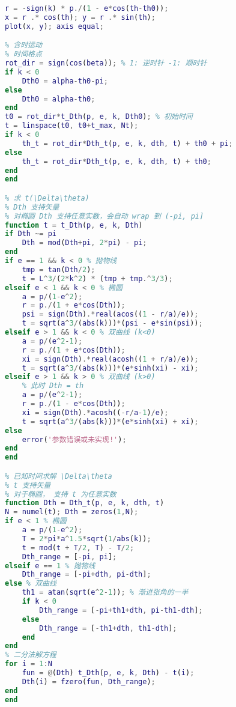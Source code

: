 \begin{lstlisting}[language=matlab,caption=kepler.m]
% 画出轨道
r = -sign(k) * p./(1 - e*cos(th-th0));
x = r .* cos(th); y = r .* sin(th);
plot(x, y); axis equal;

% 含时运动
% 时间格点
rot_dir = sign(cos(beta)); % 1: 逆时针 -1: 顺时针
if k < 0
    Dth0 = alpha-th0-pi;
else
    Dth0 = alpha-th0;
end
t0 = rot_dir*t_Dth(p, e, k, Dth0); % 初始时间
t = linspace(t0, t0+t_max, Nt);
if k < 0
    th_t = rot_dir*Dth_t(p, e, k, dth, t) + th0 + pi;
else
    th_t = rot_dir*Dth_t(p, e, k, dth, t) + th0;
end
end

% 求 t(\Delta\theta)
% Dth 支持矢量
% 对椭圆 Dth 支持任意实数，会自动 wrap 到 (-pi, pi]
function t = t_Dth(p, e, k, Dth)
if Dth ~= pi
    Dth = mod(Dth+pi, 2*pi) - pi;
end
if e == 1 && k < 0 % 抛物线
    tmp = tan(Dth/2);
    t = L^3/(2*k^2) * (tmp + tmp.^3/3);
elseif e < 1 && k < 0 % 椭圆
    a = p/(1-e^2);
    r = p./(1 + e*cos(Dth));
    psi = sign(Dth).*real(acos((1 - r/a)/e));
    t = sqrt(a^3/(abs(k)))*(psi - e*sin(psi));
elseif e > 1 && k < 0 % 双曲线 (k<0)
    a = p/(e^2-1);
    r = p./(1 + e*cos(Dth));
    xi = sign(Dth).*real(acosh((1 + r/a)/e));
    t = sqrt(a^3/(abs(k)))*(e*sinh(xi) - xi);
elseif e > 1 && k > 0 % 双曲线 (k>0)
    % 此时 Dth = th
    a = p/(e^2-1);
    r = p./(1 - e*cos(Dth));
    xi = sign(Dth).*acosh((-r/a-1)/e);
    t = sqrt(a^3/(abs(k)))*(e*sinh(xi) + xi);
else
    error('参数错误或未实现!');
end
end

% 已知时间求解 \Delta\theta
% t 支持矢量
% 对于椭圆， 支持 t 为任意实数
function Dth = Dth_t(p, e, k, dth, t)
N = numel(t); Dth = zeros(1,N);
if e < 1 % 椭圆
    a = p/(1-e^2);
    T = 2*pi*a^1.5*sqrt(1/abs(k));
    t = mod(t + T/2, T) - T/2;
    Dth_range = [-pi, pi];
elseif e == 1 % 抛物线
    Dth_range = [-pi+dth, pi-dth];
else % 双曲线
    th1 = atan(sqrt(e^2-1)); % 渐进张角的一半
    if k < 0
        Dth_range = [-pi+th1+dth, pi-th1-dth];
    else
        Dth_range = [-th1+dth, th1-dth];
    end
end
% 二分法解方程
for i = 1:N
    fun = @(Dth) t_Dth(p, e, k, Dth) - t(i);
    Dth(i) = fzero(fun, Dth_range);
end
end
\end{lstlisting}
